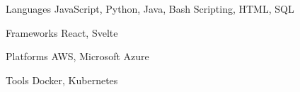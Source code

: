 
\begin{cvskills}
  \cvskill
    {Languages} %
    {JavaScript, Python, Java, Bash Scripting, HTML, SQL} %

  \cvskill
    {Frameworks} %
    {React, Svelte} %

  \cvskill
    {Platforms} %
    {AWS, Microsoft Azure} %
    
  \cvskill
    {Tools} %
    {Docker, Kubernetes} %
    
\end{cvskills}
